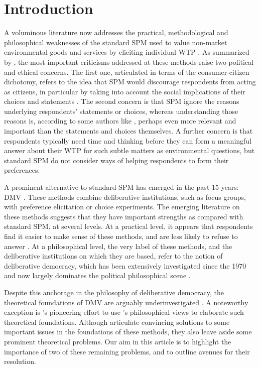 \documentclass[version=3.21, pagesize, twoside=off, bibliography=totoc, DIV=calc, fontsize=12pt, a4paper, french, english]{scrartcl}
\begin{document}
\section{Introduction}
A voluminous literature now addresses the practical, methodological and philosophical weaknesses of the standard \ac{SPM} used to value non-market environmental goods and services by eliciting individual \ac{WTP} \citep{meinard_ethical_2016}. 
As summarized by \citet{bartkowski_beyond_2018, bartkowski_deliberative_2019}, the most important criticisms addressed at these methods raise two political and ethical concerns. 
The first one, articulated in terms of the consumer-citizen dichotomy, refers to the idea that \ac{SPM} would discourage respondents from acting as citizens, in particular by taking into account the social implications of their choices and statements \citep{soma_representing_2014, vatn_institutional_2009}. 
The second concern is that \ac{SPM} ignore the reasons underlying respondents’ statements or choices, whereas understanding those reasons is, according to some authors like \citet{sen_environmental_1995}, perhaps even more relevant and important than the statements and choices themselves. A further concern is that respondents typically need time and thinking before they can form a meaningful answer about their \ac{WTP} for such subtle matters as environmental questions, but standard \ac{SPM} do not consider ways of helping respondents to form their preferences.

A prominent alternative to standard \ac{SPM} has emerged in the past 15 years: \ac{DMV} \citep{spash_deliberative_2007,bartkowski_economic_2017}. 
These methods combine deliberative institutions, such as focus groups, with preference elicitation or choice experiments. 
The emerging literature on these methods suggests that they have important strengths as compared with standard \ac{SPM}, at several levels. 
At a practical level, it appears that respondents find it easier to make sense of these methods, and are less likely to refuse to answer \citep{lienhoop_contingent_2007,szabo_reducing_2011}. 
At a philosophical level, the very label of these methods, and the deliberative institutions on which they are based, refer to the notion of deliberative democracy, which has been extensively investigated since the 1970 and now largely dominates the political philosophical scene \citep{chappell_deliberative_2012}.

Despite this anchorage in the philosophy of deliberative democracy, the theoretical foundations of \ac{DMV} are arguably underinvestigated \citep{bartkowski_economic_2017,bartkowski_beyond_2018,bunse_what_2015,kenter_what_2015}. 
A noteworthy exception is \citet{bartkowski_beyond_2018}’s pioneering effort to use \citet{sen_idea_2009}’s philosophical views to elaborate such theoretical foundations. 
Although \citet{bartkowski_beyond_2018} articulate convincing solutions to some important issues in the foundations of these methods, they also leave aside some prominent theoretical problems. 
Our aim in this article is to highlight the importance of two of these remaining problems, and to outline avenues for their resolution.
\end{document}
